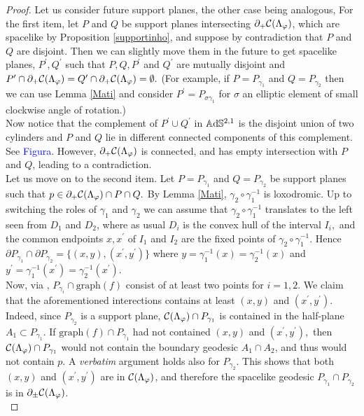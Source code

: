 \begin{proof}
    Let us consider future support planes, the other case being analogous, For the first item, let $P$ and $Q$ be support planes intersecting $\partial_+\mathcal{C}(\Lambda_\varphi)$, which are spacelike by Proposition \ref{supportinho}, and suppose by contradiction that $P$ and $Q$ are disjoint. Then we can slightly move them in the future to get spacelike planes, $P^{\prime}, Q^{\prime}$ such that $P,Q,P^{\prime}$ and $Q^{\prime}$ are mutually disjoint and $P^{\prime}\cap \partial_+\mathcal{C}(\Lambda_\varphi)=Q^{\prime}\cap\partial_+\mathcal{C}(\Lambda_\varphi)=\emptyset.$ (For example, if $P=P_{\gamma_1}$ and $Q=P_{\gamma_2}$ then we can use Lemma \ref{Mati} and consider $P^{\prime}=P_{\sigma\gamma_1}$ for $\sigma$ an elliptic element of small clockwise angle of rotation.)\\
    Now notice that the complement of $P^{\prime}\cup Q^{\prime}$ in $\mathbb{A}\mathrm{d}\mathbb{S}^{2,1}$ is the disjoint union of two cylinders and $P$ and $Q$ lie in different connected components of this complement. See \textcolor{blue}{Figura}. However, $\partial_+\mathcal{C}(\Lambda_\varphi)$ is connected, and has empty intersection with $P$ and $Q$, leading to a contradiction. \\
    Let us move on to the second item. Let $P=P_{\gamma_1}$ and $Q=P_{\gamma_2}$ be support planes such that $p\in\partial_+\mathcal{C}(\Lambda_\varphi)\cap P\cap Q.$ By Lemma \ref{Mati}, $\gamma_2\circ\gamma_1^{-1}$ is loxodromic.  Up to switching the roles of $\gamma_1$ and $\gamma_2$ we can assume that $\gamma_2\circ\gamma_1^{-1}$ translates to the left seen from $D_1$ and $D_2$, where as usual $D_i$ is the convex hull of the interval $I_i,$ and the common endpoints $x,x^{\prime}$ of $I_1$ and $I_2$ are the fixed points of $\gamma_2\circ\gamma_1^{-1}.$ Hence $\partial P_{\gamma_1}\cap\partial P_{\gamma_2}=\{(x,y),(x^{\prime}, y^{\prime})\}$ where $y=\gamma_1^{-1}(x)=\gamma_2^{-1}(x)$ and $y^{\prime}=\gamma_1^{-1}(x^{\prime})=\gamma_2^{-1}(x^{\prime})$. \\
    Now, via , $P_{\gamma_i}\cap\text{graph}(f)$ consist of at least two points for $i=1,2$. We claim that the aforementioned interections contains at least $(x,y)$ and $(x^{\prime},y^{\prime})$. Indeed, since $P_{\gamma_2}$ is a support plane, $\mathcal{C}(\Lambda_\varphi)\cap P_{\gamma_1}$ is contained in the half-plane $A_1 \subset P_{\gamma_1}.$ If $\text{graph}(f)\cap P_{\gamma_1}$ had not contained $(x,y)$ and $(x^{\prime} ,y^{\prime}),$ then $\mathcal{C}(\Lambda_\varphi)\cap P_{\gamma_1}$ would not contain the boundary geodesic $A_1 \cap A_2$, and thus would not contain $p$. A \textit{verbatim} argument holds also for $P_{\gamma_2}$. This shows that both $(x,y)$ and $(x^{\prime},y^{\prime})$ are in $\mathcal{C}(\Lambda_\varphi)$, and therefore the spacelike geodesic $P_{\gamma_1}\cap P_{\gamma_2}$ is in $\partial_\pm\mathcal{C}(\Lambda_\varphi)$. \\ 
\end{proof}

